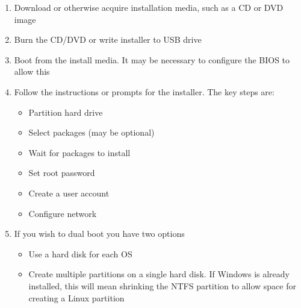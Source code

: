 \begin{enumerate}
\item Download or otherwise acquire installation media, such as a CD or DVD image
\item Burn the CD/DVD or write installer to USB drive
\item Boot from the install media.  It may be necessary to configure the BIOS to allow this
\item Follow the instructions or prompts for the installer.  The key steps are:
   \begin{itemize}
   \item Partition hard drive
   \item Select packages (may be optional)
   \item Wait for packages to install
   \item Set root password
   \item Create a user account
   \item Configure network
   \end{itemize}
\item If you wish to dual boot you have two options
   \begin{itemize}
   \item Use a hard disk for each OS
   \item Create multiple partitions on a single hard disk. If Windows is already installed, this will mean shrinking the NTFS partition to allow space for creating a Linux partition
   \end{itemize}
\end{enumerate}
